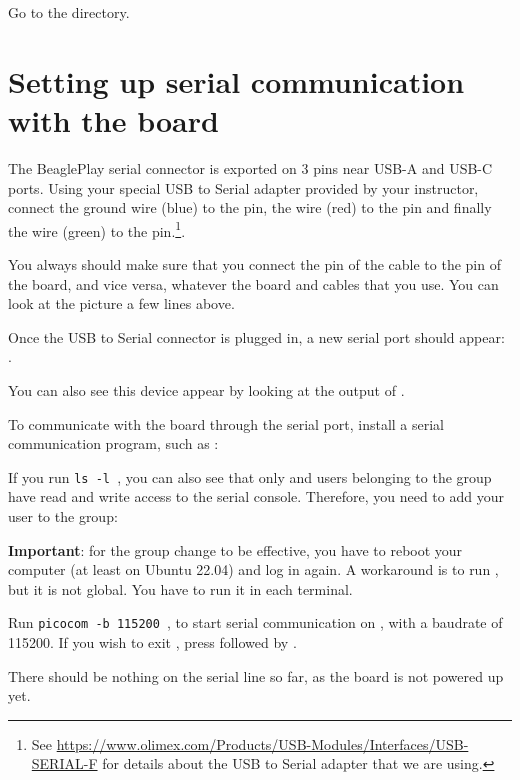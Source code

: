 Go to the  directory.

\section{Setting up serial communication with the board}
The BeaglePlay serial connector is exported on 3 pins near USB-A
and USB-C ports. Using your special USB to Serial adapter provided
by your instructor, connect the ground wire (blue) to the  pin, the
 wire (red) to the  pin and finally the  wire (green)
to the  pin.\footnote{See
\url{https://www.olimex.com/Products/USB-Modules/Interfaces/USB-SERIAL-F}
for details about the USB to Serial adapter that we are using.}.

You always should make sure that you connect the  pin of the cable
to the  pin of the board, and vice versa, whatever the board and
cables that you use. You can look at the picture a few lines above.

Once the USB to Serial connector is plugged in, a new serial port
should appear: .

You can also see this device appear by looking at the output of
.

To communicate with the board through the serial port, install a
serial communication program, such as :


If you run {\tt ls -l \hosttty}, you can also see that only
 and users belonging to the  group have
read and write access to the serial console. Therefore, you need
to add your user to the  group:


{\bf Important}: for the group change to be effective, you have to
reboot your computer (at least on Ubuntu 22.04) and log in again.
A workaround is to run , but it is not global.
You have to run it in each terminal.

Run {\tt picocom -b 115200 \hosttty}, to start serial
communication on {\tt \hosttty}, with a baudrate of 115200.
If you wish to exit , press \code{[Ctrl][a]} followed by
\code{[Ctrl][x]}.

There should be nothing on the serial line so far, as the board is not
powered up yet.

